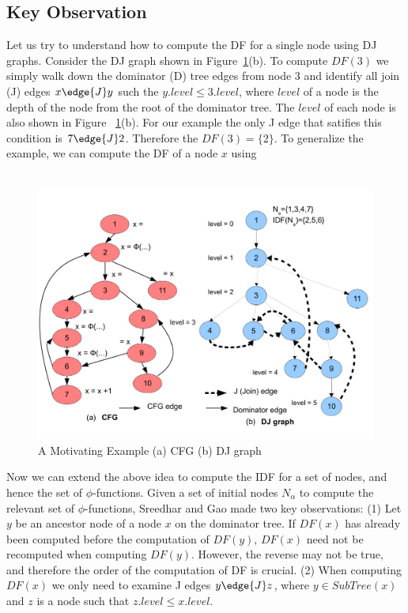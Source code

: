 \subsection{Key Observation} 
 
Let us try to understand how to compute the DF for a single node using DJ graphs. 
Consider  the DJ graph shown in Figure~\ref{fig:cfg}(b). To compute $DF(3)$ we simply walk down the
dominator (D) tree edges from node 3 and identify all join (J) edges $x \edge{J} y$ such
the $y.level \leq 3.level$, where $level$ of a node is the depth of the node from the
root of the dominator tree. The $level$ of each node is also shown in Figure ~\ref{fig:cfg}(b).
For our example the only J edge that satifies this 
condition is $7 \edge{J} 2$. Therefore the $DF(3) = \{2\}$. To generalize the example, we can
compute the DF of a node $x$ using \\
\\

    \begin{figure}[htb]
    \centerline{\includegraphics[scale=0.4]{cfglive_new.pdf}}
    \caption{A Motivating Example (a) CFG (b) DJ graph}
    \label{fig:cfg}
    \end{figure} 

Now we can extend the above idea to compute the IDF for a set of nodes, and hence
the set of $\phi$-functions. Given a set of initial nodes $N_{\alpha}$ to compute the 
relevant set of $\phi$-functions,
Sreedhar and Gao  made two key observations: (1) Let $y$ be an ancestor node of a node $x$ 
on the dominator tree. If $DF(x)$ has
already been computed before the computation of $DF(y)$,  $DF(x)$ need not
be recomputed when computing $DF(y)$. However, the reverse may not be
true, and  therefore the order of the computation of DF is crucial. 
(2) When computing $DF(x)$ we only need to examine J edges $y\edge{J} z$, where $y \in SubTree(x)$
and $z$ is a node such that $z.level \leq x.level$.

